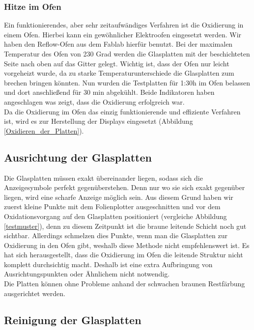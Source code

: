 \subsubsection{Hitze im Ofen}

Ein funktionierendes, aber sehr zeitaufwändiges Verfahren ist die Oxidierung in einem Ofen. Hierbei kann ein gewöhnlicher Elektroofen eingesetzt werden. Wir haben den Reflow-Ofen aus dem Fablab hierfür benutzt.
Bei der maximalen Temperatur des Ofen von 230 Grad werden die Glasplatten mit der beschichteten Seite nach oben auf das Gitter gelegt. Wichtig ist, dass der Ofen nur leicht vorgeheizt wurde, da zu starke Temperaturunterschiede die Glasplatten zum brechen bringen könnten. Nun wurden die Testplatten für 1:30h im Ofen belassen und dort anschließend für 30 min abgekühlt.
Beide Indikatoren haben angeschlagen was zeigt, dass die Oxidierung erfolgreich war.\\

Da die Oxidierung im Ofen das einzig funktionierende und effiziente Verfahren ist, wird es zur Herstellung der Displays eingesetzt (Abbildung \ref{Oxidieren_der_Platten}). 

\subsection{Ausrichtung der Glasplatten}

Die Glasplatten müssen exakt übereinander liegen, sodass sich die Anzeigesymbole perfekt gegenüberstehen. Denn nur wo sie sich exakt gegenüber liegen, wird eine scharfe Anzeige möglich sein.
Aus diesem Grund haben wir zuerst kleine Punkte mit dem Folienplotter ausgeschnitten und vor dem Oxidationsvorgang auf den Glasplatten positioniert (vergleiche Abbildung \ref{testmuster}), denn zu diesem Zeitpunkt ist die braune leitende Schicht noch gut sichtbar. Allerdings schmelzen dies Punkte, wenn man die Glasplatten zur Oxidierung in den Ofen gibt, weshalb diese Methode nicht empfehlenswert ist.
Es hat sich herausgestellt, dass die Oxidierung im Ofen die leitende Struktur nicht komplett durchsichtig macht. Deshalb ist eine extra Aufbringung von Ausrichtungspunkten oder Ähnlichem nicht notwendig.\\
Die Platten können ohne Probleme anhand der schwachen braunen Restfärbung ausgerichtet werden.

\subsection{Reinigung der Glasplatten}

